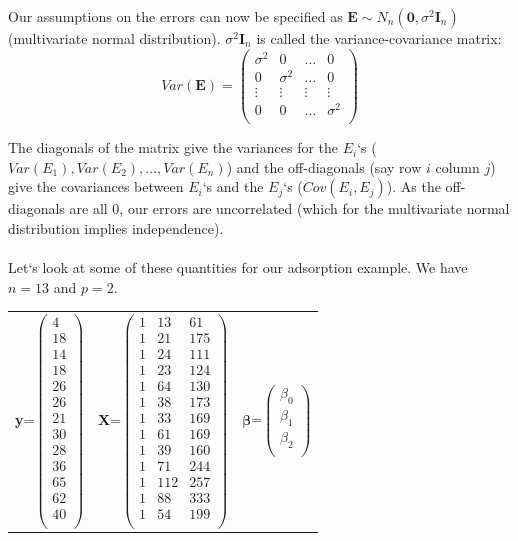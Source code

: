 Our assumptions on the errors can now be specified as $\textbf{E}\sim N_n(\boldsymbol{0},\sigma^2 \textbf{I}_{n})$ (multivariate normal distribution).  $\sigma^2 \textbf{I}_{n}$ is called the variance-covariance matrix:
$$
Var(\textbf{E})=\left(\begin{array}{cccc}
\sigma^2  &  0  &   \ldots & 0 \\
0  &  \sigma^2  &   \ldots & 0 \\
\vdots &\vdots &\vdots &\vdots  \\ 
0  &  0  &  \ldots & \sigma^2 \\
\end{array}\right)$$

The diagonals of the matrix give the variances for the $E_i$`s ($Var(E_1), Var(E_2), \ldots, Var(E_n)$) and the off-diagonals (say row $i$ column $j$) give the covariances between $E_i$`s and the $E_j$`s ($Cov(E_i, E_j)$).  As the off-diagonals are all 0, our errors are uncorrelated (which for the multivariate normal distribution implies independence).\\~\\

Let`s look at some of these quantities for our adsorption example.  We have $n=13$ and $p=2$.
\begin{center}
\begin{tabular}{ccc}
\textbf{y}=$\left(\begin{array}{c} 4 \\18\\14\\18\\26\\26\\21\\30\\28\\36\\65\\62\\40\\\end{array}\right)$ &
\textbf{X}=$\left(\begin{array}{ccc}1&13& 61\\1&21&175\\1&24&111\\1&23&124\\1&64&130\\1&38&173\\1&33&169\\1&61&169\\1&39&160\\1&71&244\\1&112&257\\1&88&333\\1&54&199\\\end{array}\right)$&
$\boldsymbol{\beta}$=$\left(\begin{array}{c} \beta_0 \\\beta_1\\\beta_2\\\end{array}\right)$ 
\end{tabular}
\end{center}

